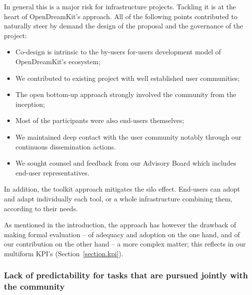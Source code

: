 In general this is a major risk for infrastructure projects. Tackling
it is at the heart of OpenDreamKit's approach. All of the following
points contributed to naturally steer by demand the design of the
proposal and the governance of the project:
\begin{itemize}
\item Co-design is intrinsic to the by-users for-users development
  model of OpenDreamKit's ecosystem;
\item We contributed to existing project with well established user
  communities;
\item The open bottom-up approach strongly involved the community from
  the inception;
\item Most of the participants were also end-users themselves;
\item We maintained deep contact with the user community notably
  through our continuous dissemination actions.
\item We sought counsel and feedback from our Advisory Board which
  includes end-user representatives.
\end{itemize}
In addition, the toolkit approach mitigates the silo effect. End-users
can adopt and adapt individually each tool, or a whole infrastructure
combining them, according to their needs.

As mentioned in the introduction, the approach has however the
drawback of making formal evaluation -- of adequacy and adoption on
the one hand, and of our contribution on the other hand -- a more
complex matter; this reflects in our multiform KPI's
(Section~\ref{section.kpi}).


\subsubsection{Lack of predictability for tasks that are pursued jointly
  with the community}

